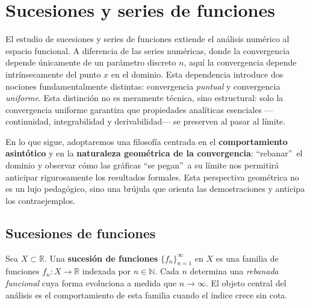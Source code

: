 
\chapter{Sucesiones y series de funciones}
\label{cap:ssfunciones}

El estudio de sucesiones y series de funciones extiende el análisis
numérico al espacio funcional. A diferencia de las series numéricas,
donde la convergencia depende únicamente de un parámetro discreto $n$,
aquí la convergencia depende intrínsecamente del punto $x$ en el
dominio. Esta dependencia introduce dos nociones fundamentalmente
distintas: convergencia \emph{puntual} y convergencia
\emph{uniforme}. Esta distinción no es meramente técnica, sino
estructural: solo la convergencia uniforme garantiza que propiedades
analíticas esenciales ---continuidad, integrabilidad y
derivabilidad--- se preserven al pasar al límite.

En lo que sigue, adoptaremos una filosofía centrada en el
\textbf{comportamiento asintótico} y en la \textbf{naturaleza
geométrica de la convergencia}: \textquotedblleft rebanar\textquotedblright\
el dominio y observar cómo las gráficas \textquotedblleft se
pegan\textquotedblright\ a su límite nos permitirá anticipar
rigurosamente los resultados formales. Esta perspectiva geométrica no
es un lujo pedagógico, sino una brújula que orienta las demostraciones
y anticipa los contraejemplos.

\section{Sucesiones de funciones}

\begin{definition}[Sucesión de funciones]
Sea $X \subset \mathbb{R}$. Una \textbf{sucesión de funciones}
$\{f_n\}_{n=1}^\infty$ en $X$ es una familia de funciones
$f_n : X \to \mathbb{R}$ indexada por $n \in \mathbb{N}$. Cada $n$
determina una \emph{rebanada funcional} cuya forma evoluciona a medida
que $n \to \infty$. El objeto central del análisis es el comportamiento
de esta familia cuando el índice crece sin cota.
\end{definition}

